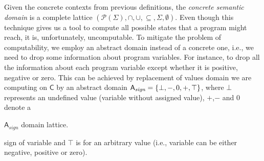 Given the concrete contexts from previous definitions, the \emph{concrete
semantic domain} is a complete lattice $(\mathcal{P}(\Sigma), \cap, \cup,
\subseteq, \Sigma, \emptyset)$. Even though this technique gives us a tool to
compute all possible states that a program might reach, it is, unfortunately,
uncomputable. To mitigate the problem of computability, we employ an abstract
domain instead of a concrete one, i.e., we need to drop some information about
program variables. For instance, to drop all the information about each program
variable except whether it is positive, negative or zero. This can be achieved
by replacement of values domain we are computing on $\mathsf{C}$ by an abstract
domain $\mathsf{A}_{\textit{sign}} = \{\bot, -, 0, +, \top\}$, where $\bot$ represents an
undefined value (variable without assigned value), $+$,$-$ and $0$ denote a
\begin{marginfigure}%
    \centering
    \caption{$\mathsf{A}_{\textit{sign}}$ domain lattice.}
    \label{fig:signd}%
\end{marginfigure}%
sign of variable and $\top$ is for an arbitrary value (i.e., variable can be
either negative, positive or zero).


